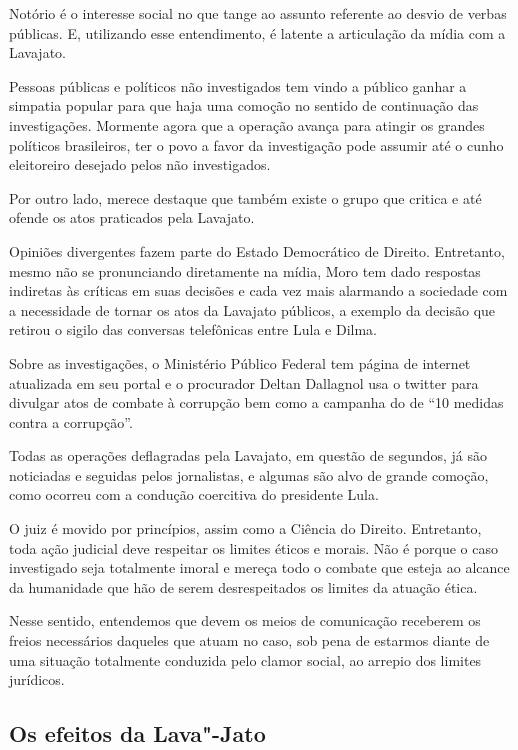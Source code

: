 Notório é o interesse social no que tange ao assunto referente ao desvio
de verbas públicas. E, utilizando esse entendimento, é latente a
articulação da mídia com a Lavajato.

Pessoas públicas e políticos não investigados tem vindo a público ganhar
a simpatia popular para que haja uma comoção no sentido de continuação
das investigações. Mormente agora que a operação avança para atingir os
grandes políticos brasileiros, ter o povo a favor da investigação pode
assumir até o cunho eleitoreiro desejado pelos não investigados.

Por outro lado, merece destaque que também existe o grupo que critica e
até ofende os atos praticados pela Lavajato.

Opiniões divergentes fazem parte do Estado Democrático de Direito.
Entretanto, mesmo não se pronunciando diretamente na mídia, Moro tem
dado respostas indiretas às críticas em suas decisões e cada vez mais
alarmando a sociedade com a necessidade de tornar os atos da Lavajato
públicos, a exemplo da decisão que retirou o sigilo das conversas
telefônicas entre Lula e Dilma.

Sobre as investigações, o Ministério Público Federal tem página de
internet atualizada em seu portal e o procurador Deltan Dallagnol usa o
twitter para divulgar atos de combate à corrupção bem como a campanha do
 de ``10 medidas contra a corrupção''.

Todas as operações deflagradas pela Lavajato, em questão de segundos, já
são noticiadas e seguidas pelos jornalistas, e algumas são alvo de
grande comoção, como ocorreu com a condução coercitiva do presidente
Lula.

O juiz é movido por princípios, assim como a Ciência do Direito.
Entretanto, toda ação judicial deve respeitar os limites éticos e
morais. Não é porque o caso investigado seja totalmente imoral e mereça
todo o combate que esteja ao alcance da humanidade que hão de serem
desrespeitados os limites da atuação ética.

Nesse sentido, entendemos que devem os meios de comunicação receberem os
freios necessários daqueles que atuam no caso, sob pena de estarmos
diante de uma situação totalmente conduzida pelo clamor social, ao
arrepio dos limites jurídicos.

\subsection{Os efeitos da Lava"-Jato}

